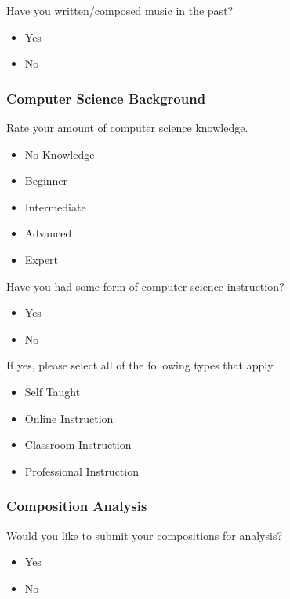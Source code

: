 \noindent Have you written/composed music in the past?

\begin{itemize}
	\item Yes
	\item No
\end{itemize}

\subsubsection{Computer Science Background}
\label{subsubsec:computersciencebackground}

Rate your amount of computer science knowledge.

\begin{itemize}
	\item No Knowledge
	\item Beginner
	\item Intermediate
	\item Advanced
	\item Expert
\end{itemize}

\noindent Have you had some form of computer science instruction?

\begin{itemize}
	\item Yes
	\item No
\end{itemize}

\noindent If yes, please select all of the following types that apply.

\begin{itemize}
	\item Self Taught
	\item Online Instruction
	\item Classroom Instruction
	\item Professional Instruction
\end{itemize}

\subsubsection{Composition Analysis}
\label{subsubsec:compositionanalysis}

Would you like to submit your compositions for analysis?

\begin{itemize}
	\item Yes
	\item No
\end{itemize}

